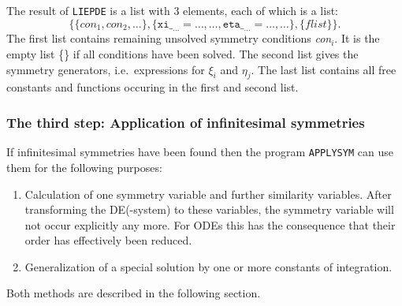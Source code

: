The result of \texttt{LIEPDE} is a list with 3 elements, each of which
is a list:
\[ \{\{\textit{con}_1,\textit{con}_2,\ldots\},
     \{\texttt{xi}\__{\ldots}=\ldots, \ldots,
       \texttt{eta}\__{\ldots}=\ldots, \ldots\},
     \{\textit{flist}\}\}. \]
The first list contains remaining unsolved symmetry conditions \textit{con}$_i$. It
is the empty list \{\} if all conditions have been solved. The second list
gives the symmetry generators, i.e.\ expressions for $\xi_i$ and $\eta_j$. The 
last list contains all free constants and functions occuring in the first
and second list.

%
%
\subsubsection{The third step: Application of infinitesimal symmetries}
If infinitesimal symmetries have been found then
the program \texttt{APPLYSYM} can use them for the following purposes:
\begin{enumerate}
\item Calculation of one symmetry variable and further similarity variables.
After transforming
the DE(-system) to these variables, the symmetry variable will not occur
explicitly any more. For ODEs this has the consequence that their order has
effectively been reduced.
\item Generalization of a special solution by one or more constants of
integration.
\end{enumerate}
Both methods are described in the following section.
